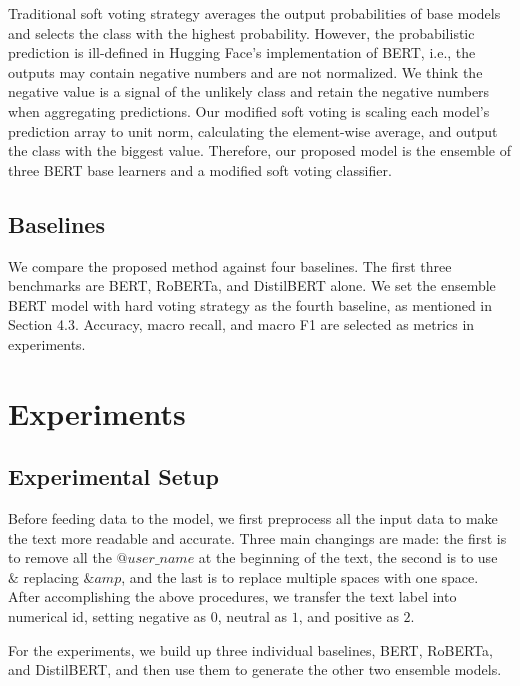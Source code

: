 \documentclass[runningheads]{llncs}
\begin{document}
Traditional soft voting strategy averages the output probabilities of base models and selects the class with the highest probability. However, the probabilistic prediction is ill-defined in Hugging Face's implementation of BERT, i.e., the outputs may contain negative numbers and are not normalized. We think the negative value is a signal of the unlikely class and retain the negative numbers when aggregating predictions. Our modified soft voting is scaling each model's prediction array to unit norm, calculating the element-wise average, and output the class with the biggest value. Therefore, our proposed model is the ensemble of three BERT base learners and a modified soft voting classifier.

\subsection{Baselines}
We compare the proposed method against four baselines. The first three benchmarks are BERT, RoBERTa, and DistilBERT alone. We set the ensemble BERT model with hard voting strategy as the fourth baseline, as mentioned in Section 4.3. Accuracy, macro recall, and macro F1 are selected as metrics in experiments.

\section{Experiments}
\subsection{Experimental Setup}
Before feeding data to the model, we first preprocess all the input data to make the text more readable and accurate. Three main changings are made: the first is to remove all the $@user\_name$ at the beginning of the text, the second is to use $\&$ replacing $\&amp$, and the last is to replace multiple spaces with one space. After accomplishing the above procedures, we transfer the text label into numerical id, setting negative as $0$, neutral as $1$, and positive as $2$.

For the experiments, we build up three individual baselines, BERT, RoBERTa, and DistilBERT, and then use them to generate the other two ensemble models.
\end{document}

